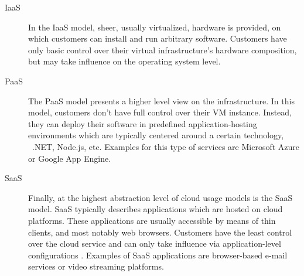 \begin{description}
\item[IaaS] In the IaaS model, sheer, usually virtualized, hardware is provided, on which customers can install and run arbitrary software. Customers have only basic control over their virtual infrastructure's hardware composition, but may take influence on the operating system level.
\item[PaaS] The PaaS model presents a higher level view on the infrastructure. In this model, customers don't have full control over their VM instance. Instead, they can deploy their software in predefined application-hosting environments \cite{mell2011nist} which are typically centered around a certain technology, \eg\ .NET, Node.js, etc. Examples for this type of services are Microsoft Azure or Google App Engine.
\item[SaaS] Finally, at the highest abstraction level of cloud usage models is the SaaS model. SaaS typically describes applications which are hosted on cloud platforms. These applications are usually accessible by means of thin clients, and most notably web browsers. Customers have the least control over the cloud service and can only take influence via application-level configurations \cite{mell2011nist}. Examples of SaaS applications are browser-based e-mail services or video streaming platforms.
\end{description}

%
%
%
%
%
%
%
%
%
%

